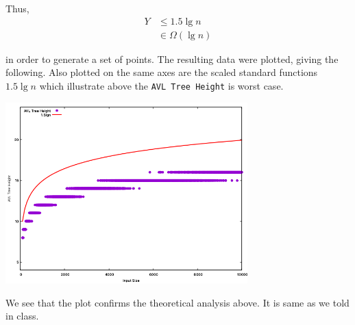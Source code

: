 \documentclass[11pt]{article}
\begin{document}
Thus, 
\begin{align*}
    Y &\leq 1.5\lg n \\
      &\in \Omega(\lg n)
\end{align*}     


in order to generate a set of points.  The resulting data were
plotted, giving the following.  Also plotted on the same axes are the
scaled standard functions $1.5\lg n$ which illustrate above the 
\texttt{AVL Tree Height} is worst case.

\begin{center}
  \includegraphics[width=0.7\textwidth]{analysis.png}
\end{center} 

We see that the plot confirms the theoretical analysis above. It is same
as we told in class.
\end{document}
